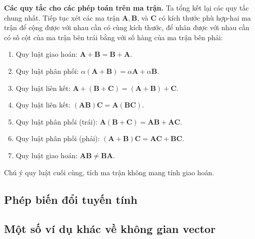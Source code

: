 \textbf{Các quy tắc cho các phép toán trên ma trận.} Ta tổng kết lại các quy tắc chung nhất.
Tiếp tục xét các ma trận \(\mathbf{A},\mathbf{B}\), và \(\mathbf{C}\) có kích thước phù hợp-hai ma trận để cộng được với nhau cần có cùng kích thước, để nhân được với nhau cần có số cột của ma trận bên trái bằng với số hàng của ma trận bên phải:
\begin{enumerate}[label=(\alph*)]
    \item Quy luật giao hoán: \(\mathbf{A}+\mathbf{B}=\mathbf{B}+\mathbf{A}.\)
    \item Quy luật phân phối: \(\alpha(\mathbf{A}+\mathbf{B})=\alpha\mathbf{A}+\alpha\mathbf{B}.\)
    \item Quy luật liên kết: \(\mathbf{A}+(\mathbf{B}+\mathbf{C})=(\mathbf{A}+\mathbf{B})+\mathbf{C}.\)
    \item Quy luật liên kết: \((\mathbf{AB})\mathbf{C}=\mathbf{A}(\mathbf{BC}).\)
    \item Quy luật phân phối (trái): \(\mathbf{A}(\mathbf{B}+\mathbf{C})=\mathbf{AB}+\mathbf{AC}.\)
    \item Quy luật phân phối (phải): \((\mathbf{A}+\mathbf{B})\mathbf{C}=\mathbf{AC}+\mathbf{BC}.\)
    \item Quy luật giao hoán: \(\mathbf{AB} \neq \mathbf{BA}\).
\end{enumerate}
Chú ý quy luật cuối cùng, tích ma trận không mang tính giao hoán.

\subsection{Phép biến đổi tuyến tính}

\subsection{Một số ví dụ khác về không gian vector}\label{morexample}


